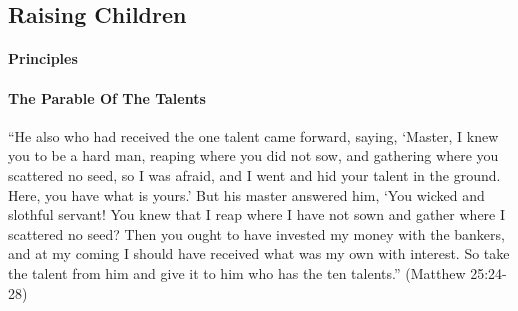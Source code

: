 \documentclass[a4paper, 12pt]{article}
\begin{document}
\subsection{Raising Children}
\paragraph{Principles}
\paragraph{The Parable Of The Talents}
``He also who had received the one talent came forward, saying, ‘Master, I knew you to be a hard man, reaping where you did not sow, and gathering where you scattered no seed, so I was afraid, and I went and hid your talent in the ground. Here, you have what is yours.’ But his master answered him, ‘You wicked and slothful servant! You knew that I reap where I have not sown and gather where I scattered no seed? Then you ought to have invested my money with the bankers, and at my coming I should have received what was my own with interest. So take the talent from him and give it to him who has the ten talents.'' (Matthew 25:24-28)
\end{document}
